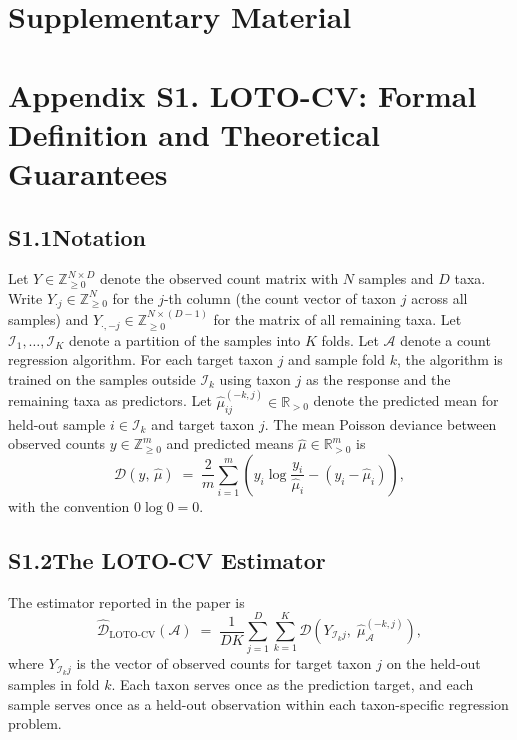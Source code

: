 \section*{Supplementary Material}

\section*{Appendix S1. LOTO-CV: Formal Definition and Theoretical Guarantees}

\subsection*{S1.1\quad Notation}

Let $Y \in \mathbb{Z}_{\geq 0}^{N \times D}$ denote the observed count matrix with $N$ samples and $D$ taxa.
Write $Y_{\cdot j} \in \mathbb{Z}_{\geq 0}^{N}$ for the $j$-th column (the count vector of taxon $j$ across all samples) and $Y_{\cdot,-j} \in \mathbb{Z}_{\geq 0}^{N \times (D-1)}$ for the matrix of all remaining taxa.
Let $\mathcal{I}_1,\ldots,\mathcal{I}_K$ denote a partition of the samples into $K$ folds.
Let $\mathcal{A}$ denote a count regression algorithm.
For each target taxon $j$ and sample fold $k$, the algorithm is trained on the samples outside $\mathcal{I}_k$ using taxon $j$ as the response and the remaining taxa as predictors.
Let $\hat{\mu}^{(-k,j)}_{ij} \in \mathbb{R}_{>0}$ denote the predicted mean for held-out sample $i \in \mathcal{I}_k$ and target taxon $j$.
The mean Poisson deviance between observed counts $y \in \mathbb{Z}_{\geq 0}^{m}$ and predicted means $\hat{\mu} \in \mathbb{R}_{>0}^{m}$ is
\[
  \mathcal{D}(y,\, \hat{\mu})
  \;=\;
  \frac{2}{m} \sum_{i=1}^{m} \left( y_i \log \frac{y_i}{\hat{\mu}_i} - (y_i - \hat{\mu}_i) \right),
\]
with the convention $0 \log 0 = 0$.

\subsection*{S1.2\quad The LOTO-CV Estimator}

The estimator reported in the paper is
\[
  \widehat{\mathcal{D}}_{\mathrm{LOTO}\text{-}\mathrm{CV}}(\mathcal{A})
  \;=\;
  \frac{1}{DK} \sum_{j=1}^{D}\sum_{k=1}^{K}
  \mathcal{D}\!\left(Y_{\mathcal{I}_k j},\; \hat{\mu}^{(-k,j)}_{\mathcal{A}}\right),
\]
where $Y_{\mathcal{I}_k j}$ is the vector of observed counts for target taxon $j$ on the held-out samples in fold $k$.
Each taxon serves once as the prediction target, and each sample serves once as a held-out observation within each taxon-specific regression problem.

